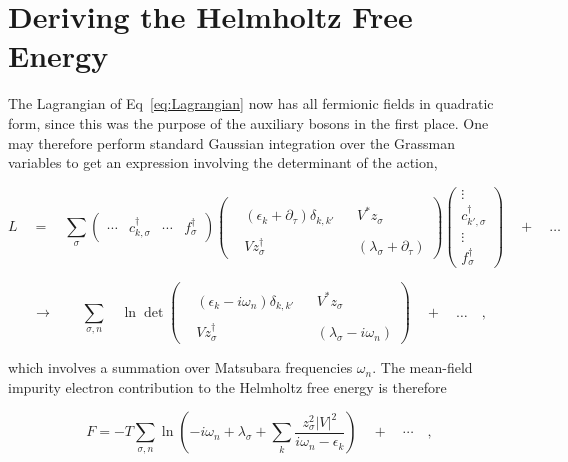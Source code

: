 \section{Deriving the Helmholtz Free Energy}
\label{sec:Free_Energy}

The Lagrangian of Eq~\eqref{eq:Lagrangian} now has all fermionic fields in quadratic form, since this was the purpose of the auxiliary bosons in the first place. One may therefore perform standard Gaussian integration over the Grassman variables to get an expression involving the determinant of the action,


\[
L \quad = \quad \sum_{\sigma}
\begin{pmatrix} \cdots & c^{\dagger}_{k,\sigma} & \cdots & f^{\dagger}_{\sigma} \end{pmatrix}
\begin{pmatrix} & & & \\ &(\epsilon_{k} + \partial_{\tau}) \delta_{k, k'} & & V^{\ast} z^{}_{\sigma} \\ & & & \\ & V z^{\dagger}_{\sigma} & & (\lambda_{\sigma} + \partial_{\tau}) \end{pmatrix}
\begin{pmatrix} \vdots \\ c^{\dagger}_{k',\sigma} \\ \vdots \\ f^{\dagger}_{\sigma} \end{pmatrix}
\quad + \quad \hdots
\]

\[
\rightarrow \qquad \sum_{\sigma, n} \quad \ln \det
\begin{pmatrix} & & & \\ &(\epsilon_{k} - i \omega_{n}) \delta_{k, k'} & & V^{\ast} z^{}_{\sigma} \\ & & & \\ & V z^{\dagger}_{\sigma} & & (\lambda_{\sigma} - i \omega_{n}) \end{pmatrix}
\quad + \quad \hdots \quad ,
\]

which involves a summation over Matsubara frequencies $ \omega_{n} $. The mean-field impurity electron contribution to the Helmholtz free energy is therefore

\[
F = - T \sum_{\sigma, n} \ln{\left(- i \omega_{n} + \lambda_{\sigma} + \sum_{k} \frac{z_{\sigma}^{2} |V|^{2}}{i \omega_{n} - \epsilon_{k}}\right)} \quad + \quad \cdots \quad ,
\]

